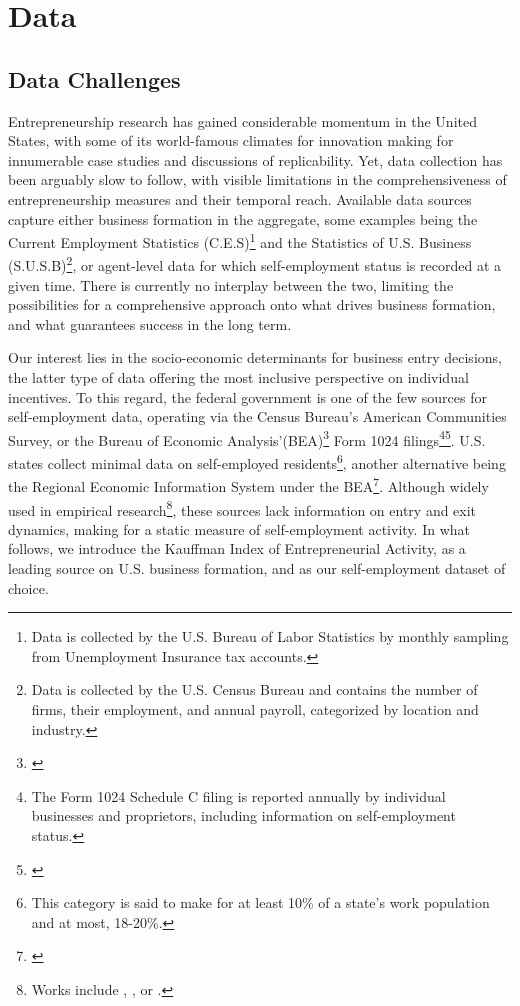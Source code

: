 \chapter{Data\label{ch:data}}

\section{Data Challenges}

Entrepreneurship research has gained considerable momentum in the United States, with some of its world-famous climates for innovation making for innumerable case studies and discussions of replicability. Yet, data collection has been arguably slow to follow, with visible limitations in the comprehensiveness of entrepreneurship measures and their temporal reach. Available data sources capture either business formation in the aggregate, some examples being the Current Employment Statistics (C.E.S)\footnote{Data is collected by the U.S. Bureau of Labor Statistics by monthly sampling from Unemployment Insurance tax accounts.} and the Statistics of U.S. Business (S.U.S.B)\footnote{Data is collected by the U.S. Census Bureau and contains the number of firms, their employment, and annual payroll, categorized by location and industry.}, or agent-level data for which self-employment status is recorded at a given time. There is currently no interplay between the two, limiting the possibilities for a comprehensive approach onto what drives business formation, and what guarantees success in the long term. 

Our interest lies in the socio-economic determinants for business entry decisions, the latter type of data offering the most inclusive perspective on individual incentives. To this regard, the federal government is one of the few sources for self-employment data, operating via the Census Bureau's American Communities Survey, or the Bureau of Economic Analysis'(BEA)\footnote{\cite{BEA}} Form 1024 filings\footnote{The Form 1024 Schedule C filing is reported annually by individual businesses and proprietors, including information on self-employment status. }\footnote{\cite{Goetz2008}}. U.S. states collect minimal data on self-employed residents\footnote{This category is said to make for at least 10\% of a state's work population and at most, 18-20\%.}, another alternative being the Regional Economic Information System under the BEA\footnote{\cite{Goetz2008}}. Although widely used in empirical research\footnote{Works include \cite{Glaeser2007}, \cite{AcsArmington2006}, or \cite{ShresthaGoetzRupasingha2007}. }, these sources lack information on entry and exit dynamics, making for a  static measure of self-employment activity. In what follows, we introduce the Kauffman Index of Entrepreneurial Activity, as a leading source on U.S. business formation, and as our self-employment dataset of choice. 

